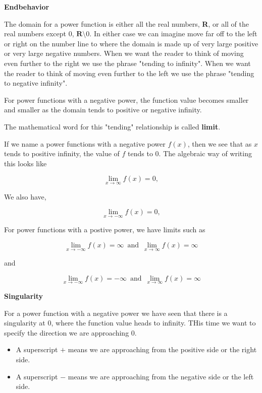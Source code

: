 \documentclass{ximera}
\begin{document}
\textbf{Endbehavior}

The domain for a power function is either all the real numbers, \textbf{R}, or all of the real numbers except $0$, $\textbf{R} \setminus 0$.  In either case we can imagine move far off to the left or right on the number line to where the domain is made up of very large positive or very large negative numbers.  When we want the reader to think of moving even further to the right we use the phrase "tending to infinity". When we want the reader to think of moving even further to the left we use the phrase "tending to negative infinity".

For power functions with a negative power, the function value becomes smaller and smaller as the domain tends to positive or negative infinity.

The mathematical word for this "tending" relationship is called \textbf{limit}.

If we name a power functions with a negative power $f(x)$, then we see that as $x$ tends to positive infinity, the value of $f$ tends to $0$.  The algebraic way of writing this looks like


\[    \lim_{x \to \infty} f(x) = 0,        \]


We also have,

\[    \lim_{x \to -\infty} f(x) = 0,        \]



For power functions with a postive power, we have limits such as 



\[    \lim_{x \to -\infty} f(x) =  \infty  \,   \text{ and }  \,     \lim_{x \to \infty} f(x) = \infty      \]


and 

\[    \lim_{x \to -\infty} f(x) =  -\infty  \,   \text{ and }  \,     \lim_{x \to \infty} f(x) = \infty      \]






\textbf{Singularity}



For a power function with a negative power we have seen that there is a singularity at $0$, where the function value heads to infinity.  THis time we want to specify the direction we are approaching $0$.  

\begin{itemize}
\item A superscript $+$ means we are approaching from the positive side or the right side.
\item A superscript $-$ means we are approaching from the negative side or the left side.
\end{itemize}
\end{document}
